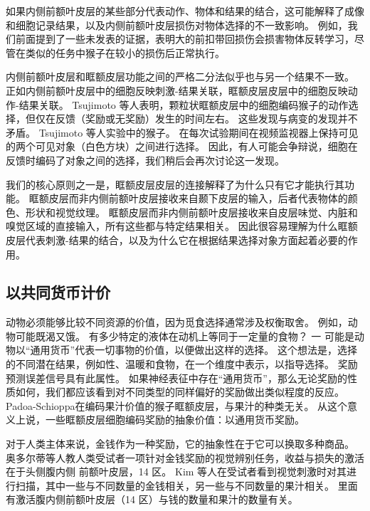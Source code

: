 如果内侧前额叶皮层的某些部分代表动作、物体和结果的结合，这可能解释了成像和细胞记录结果，以及内侧前额叶皮层损伤对物体选择的不一致影响。
例如，我们前面提到了一些未发表的证据，表明大的前扣带回损伤会损害物体反转学习\cite{murray2006prospective}，尽管在类似的任务中猴子在较小的损伤后正常执行\cite{rudebeck2006separate}。\par


内侧前额叶皮层和眶额皮层功能之间的严格二分法似乎也与另一个结果不一致。
正如内侧前额叶皮层中的细胞反映刺激-结果关联\cite{kennerley2009evaluating}，眶额皮层皮层中的细胞反映动作-结果关联。
Tsujimoto 等人\cite{tsujimoto2009monkey}表明，颗粒状眶额皮层中的细胞编码猴子的动作选择，但仅在反馈（奖励或无奖励）发生的时间左右。
这些发现与病变的发现并不矛盾。
Tsujimoto 等人实验中的猴子。
在每次试验期间在视频监视器上保持可见的两个可见对象（白色方块）之间进行选择。
因此，有人可能会争辩说，细胞在反馈时编码了对象之间的选择，我们稍后会再次讨论这一发现。\par


我们的核心原则之一是，眶额皮层皮层的连接解释了为什么只有它才能执行其功能。
眶额皮层而非内侧前额叶皮层接收来自颞下皮层的输入，后者代表物体的颜色、形状和视觉纹理。
眶额皮层而非内侧前额叶皮层接收来自皮层味觉、内脏和嗅觉区域的直接输入，所有这些都与特定结果相关。
因此很容易理解为什么眶额皮层代表刺激-结果的结合，以及为什么它在根据结果选择对象方面起着必要的作用。\par



\subsection{以共同货币计价}

动物必须能够比较不同资源的价值，因为觅食选择通常涉及权衡取舍。
例如，动物可能既渴又饿。
有多少特定的液体在动机上等同于一定量的食物？ 一
可能是动物以“通用货币”代表一切事物的价值，以便做出这样的选择。
这个想法是，选择的不同潜在结果，例如性、温暖和食物，在一个维度中表示，以指导选择\cite{montague2002neural}。
奖励预测误差信号具有此属性。
如果神经表征中存在“通用货币”，那么无论奖励的性质如何，我们都应该看到对不同类型的同样偏好的奖励做出类似程度的反应。
Padoa-Schioppa\cite{padoa2006neurons}在编码果汁价值的猴子眶额皮层，与果汁的种类无关。
从这个意义上说，一些眶额皮层细胞编码奖励的抽象价值：以通用货币奖励。\par


对于人类主体来说，金钱作为一种奖励，它的抽象性在于它可以换取多种商品。
奥多尔蒂等人\cite{o2001abstract}教人类受试者一项针对金钱奖励的视觉辨别任务，收益与损失的激活在于头侧腹内侧 前额叶皮层，14 区。
Kim 等人\cite{kim2011overlapping}在受试者看到视觉刺激时对其进行扫描，其中一些与不同数量的金钱相关，另一些与不同数量的果汁相关。
里面有激活腹内侧前额叶皮层（14 区）与钱的数量和果汁的数量有关。\par


